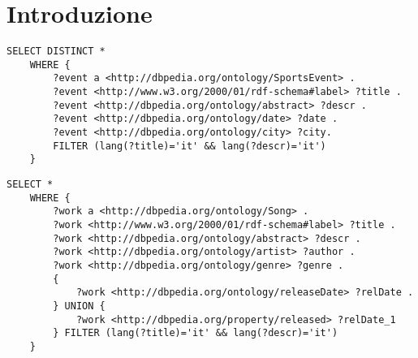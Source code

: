\documentclass{book}
\begin{document}
\section{Introduzione}

\begin{lstlisting}
SELECT DISTINCT *
	WHERE {
		?event a <http://dbpedia.org/ontology/SportsEvent> .
		?event <http://www.w3.org/2000/01/rdf-schema#label> ?title .
		?event <http://dbpedia.org/ontology/abstract> ?descr .
		?event <http://dbpedia.org/ontology/date> ?date .
		?event <http://dbpedia.org/ontology/city> ?city.
		FILTER (lang(?title)='it' && lang(?descr)='it')
	}
\end{lstlisting}

\begin{lstlisting}
SELECT *
	WHERE {
		?work a <http://dbpedia.org/ontology/Song> .
		?work <http://www.w3.org/2000/01/rdf-schema#label> ?title .
		?work <http://dbpedia.org/ontology/abstract> ?descr .
		?work <http://dbpedia.org/ontology/artist> ?author .
		?work <http://dbpedia.org/ontology/genre> ?genre .
		{
			?work <http://dbpedia.org/ontology/releaseDate> ?relDate .
		} UNION {
			?work <http://dbpedia.org/property/released> ?relDate_1
		} FILTER (lang(?title)='it' && lang(?descr)='it')
	}
\end{lstlisting}
\end{document}
